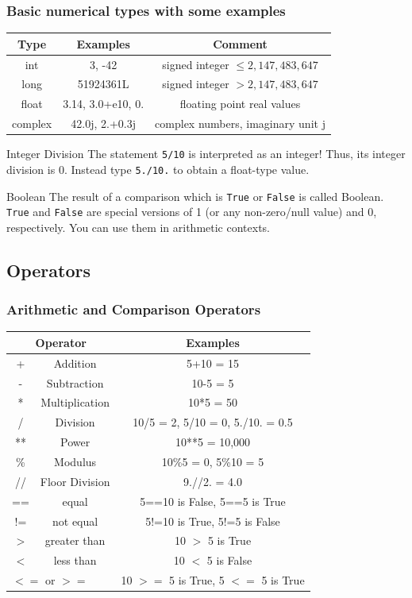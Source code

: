 \documentclass{beamer}
\begin{document}
\begin{frame}
\frametitle{Basic numerical types with some examples}
	\begin{tabular}{c|c|c}
		Type & Examples & Comment \\ \hline
		int  & 3, -42 &  signed integer $ \leq 2,147,483,647$\\
		long & 51924361L & signed integer $>2,147,483,647$ \\
		float & 3.14, 3.0+e10, 0. & floating point real values \\
		complex & 42.0j, 2.+0.3j & complex numbers, imaginary unit j
 	\end{tabular}
 	
 	\begin{alertblock}{Integer Division}
 		The statement \texttt{5/10} is interpreted as an integer! Thus, its integer division is 0. Instead type 			\texttt{5./10.} to obtain a float-type value.
 	\end{alertblock}
 	\begin{block}{Boolean}
 		The result of a comparison which is \texttt{True} or \texttt{False} is called Boolean. \texttt{True} and 			\texttt{False} are special versions of 1 (or any non-zero/null value) and 0, respectively. You can use them in arithmetic contexts.
 	\end{block}	
\end{frame}

\subsection{Operators}

\begin{frame}
\frametitle{Arithmetic and Comparison Operators}
	\begin{tabular}{cc|c}
		\multicolumn{2}{c|}{Operator} & Examples  \\ \hline
		+ & Addition & 5+10 = 15  \\
		- & Subtraction & 10-5 = 5  \\
		* & Multiplication & 10*5 = 50   \\
		/ & Division & 10/5 = 2, 5/10 = 0, 5./10. = 0.5 \\
		** & Power & 10**5 = 10,000 \\
		\% & Modulus & 10\%5 = 0, 5\%10 = 5 \\
		// & Floor Division & 9.//2. = 4.0 \\ \hline
		== & equal & 5==10 is False, 5==5 is True  \\
		!= & not equal & 5!=10 is True, 5!=5 is False  \\
		$>$ & greater than & 10 $>$ 5 is True  \\
		$<$ & less than & 10 $<$ 5 is False \\
		\multicolumn{2}{l|}{$<=$ or $>=$} & 10 $>=$ 5 is True, 5 $<=$ 5 is True \\
 	\end{tabular}	
\end{frame}
\end{document}
